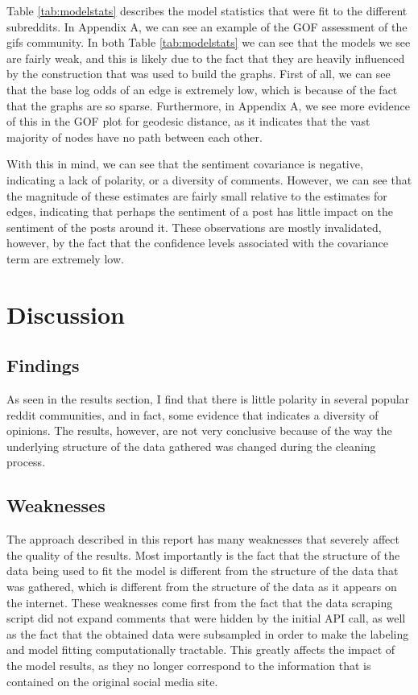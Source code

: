 \documentclass[
]{article}
\begin{document}
Table \ref{tab:modelstats} describes the model statistics that were fit to the different subreddits. In Appendix A, we can see an example of the GOF assessment of the gifs community. In both Table \ref{tab:modelstats} we can see that the models we see are fairly weak, and this is likely due to the fact that they are heavily influenced by the construction that was used to build the graphs. First of all, we can see that the base log odds of an edge is extremely low, which is because of the fact that the graphs are so sparse. Furthermore, in Appendix A, we see more evidence of this in the GOF plot for geodesic distance, as it indicates that the vast majority of nodes have no path between each other.

With this in mind, we can see that the sentiment covariance is negative, indicating a lack of polarity, or a diversity of comments. However, we can see that the magnitude of these estimates are fairly small relative to the estimates for edges, indicating that perhaps the sentiment of a post has little impact on the sentiment of the posts around it. These observations are mostly invalidated, however, by the fact that the confidence levels associated with the covariance term are extremely low.

\hypertarget{discussion}{%
\section{Discussion}\label{discussion}}

\hypertarget{findings}{%
\subsection{Findings}\label{findings}}

As seen in the results section, I find that there is little polarity in several popular reddit communities, and in fact, some evidence that indicates a diversity of opinions. The results, however, are not very conclusive because of the way the underlying structure of the data gathered was changed during the cleaning process.

\hypertarget{weaknesses}{%
\subsection{Weaknesses}\label{weaknesses}}

The approach described in this report has many weaknesses that severely affect the quality of the results. Most importantly is the fact that the structure of the data being used to fit the model is different from the structure of the data that was gathered, which is different from the structure of the data as it appears on the internet. These weaknesses come first from the fact that the data scraping script did not expand comments that were hidden by the initial API call, as well as the fact that the obtained data were subsampled in order to make the labeling and model fitting computationally tractable. This greatly affects the impact of the model results, as they no longer correspond to the information that is contained on the original social media site.
\end{document}
